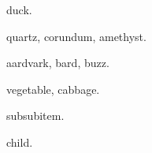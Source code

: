 \documentclass{article}
\begin{document}
\gls{duck}.

\gls{quartz}, \gls{corundum}, \gls{amethyst}.

\gls{aardvark}, \gls{bard}, \gls{buzz}.

\gls{vegetable}, \gls{cabbage}.

\gls{subsubitem}.

\gls{child}.

\printunsrtglossaries
\end{document}

